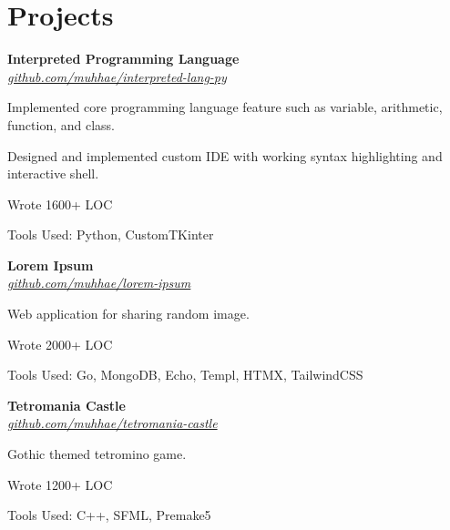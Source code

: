 \section{Projects}
    \begin{twocolentry}{
    }
    \textbf{Interpreted Programming Language}\\
    \textit{\href{https://github.com/muhhae/interpreted-lang-py}{github.com/muhhae/interpreted-lang-py}}
    \end{twocolentry}

    \vspace{0.10 cm}
    \begin{onecolentry}
        \begin{highlights}
            \item Implemented core programming language feature such as variable, arithmetic, function,
                and class.
            \item Designed and implemented custom IDE with working syntax highlighting and interactive shell.
            \item Wrote 1600+ LOC
            \item Tools Used: Python, CustomTKinter
        \end{highlights}
    \end{onecolentry}

    \vspace{0.2 cm}

    \begin{twocolentry}{
    }
    \textbf{Lorem Ipsum}\\
    \textit{\href{https://github.com/muhhae/lorem-ipsum}{github.com/muhhae/lorem-ipsum}}
    \end{twocolentry}

    \vspace{0.10 cm}
    \begin{onecolentry}
        \begin{highlights}
            \item Web application for sharing random image.
            \item Wrote 2000+ LOC
            \item Tools Used: Go, MongoDB, Echo, Templ, HTMX, TailwindCSS
        \end{highlights}
    \end{onecolentry}

        \vspace{0.2 cm}

    \begin{twocolentry}{
    }
    \textbf{Tetromania Castle}\\
    \textit{\href{https://github.com/muhhae/tetromania-castle}{github.com/muhhae/tetromania-castle}}
    \end{twocolentry}

    \vspace{0.10 cm}
    \begin{onecolentry}
        \begin{highlights}
            \item Gothic themed tetromino game.
            \item Wrote 1200+ LOC
            \item Tools Used: C++, SFML, Premake5
        \end{highlights}
    \end{onecolentry}
